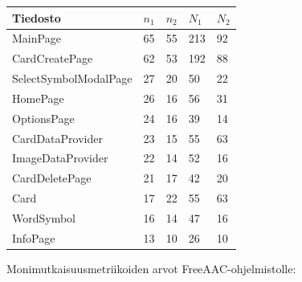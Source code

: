 \documentclass[utf8]{gradu3}
\begin{document}
\begin{center}
    \begin{tabular}{| l | l | l | l | l |}
    \hline
    \textbf{Tiedosto} & \textbf{$n_1$} & \textbf{$n_2$} & \textbf{$N_1$} & \textbf{$N_2$} \\ \hline
    MainPage & 65 & 55 & 213 & 92 \\ \hline
    CardCreatePage & 62 & 53 & 192 & 88 \\ \hline
    SelectSymbolModalPage & 27 & 20 & 50 & 22 \\ \hline
    HomePage & 26 & 16 & 56 & 31 \\ \hline
    OptionsPage & 24 & 16 & 39 & 14 \\ \hline
    CardDataProvider & 23 & 15 & 55 & 63 \\ \hline
    ImageDataProvider & 22 & 14 & 52 & 16 \\ \hline
    CardDeletePage & 21 & 17 & 42 & 20 \\ \hline
    Card & 17 & 22 & 55 & 63 \\ \hline
    WordSymbol & 16 & 14 & 47 & 16 \\ \hline
    InfoPage & 13 & 10 & 26 & 10 \\ \hline
    \end{tabular}
\end{center}

Monimutkaisuusmetriikoiden arvot FreeAAC-ohjelmistolle:
\end{document}
